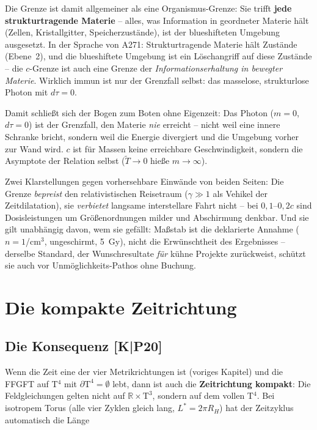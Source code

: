 Die Grenze ist damit allgemeiner als eine Organismus-Grenze: Sie
trifft \textbf{jede strukturtragende Materie} -- alles, was
Information in geordneter Materie hält (Zellen, Kristallgitter,
Speicherzustände), ist der blueshifteten Umgebung ausgesetzt. In
der Sprache von A271: Strukturtragende Materie hält Zustände
(Ebene~2), und die blueshiftete Umgebung ist ein Löschangriff auf
diese Zustände -- die $c$-Grenze ist auch eine Grenze der
\emph{Informationserhaltung in bewegter Materie}. Wirklich immun
ist nur der Grenzfall selbst: das masselose, strukturlose Photon
mit $d\tau = 0$.

Damit schließt sich der Bogen zum Boten ohne Eigenzeit: Das Photon
($m = 0$, $d\tau = 0$) ist der Grenzfall, den Materie \emph{nie}
erreicht -- nicht weil eine innere Schranke bricht, sondern weil
die Energie divergiert und die Umgebung vorher zur Wand wird. $c$
ist für Massen keine erreichbare Geschwindigkeit, sondern die
Asymptote der Relation selbst ($\tilde T \to 0$ hieße
$m \to \infty$).

Zwei Klarstellungen gegen vorhersehbare Einwände von beiden Seiten:
Die Grenze \emph{bepreist} den relativistischen Reisetraum
($\gamma \gg 1$ als Vehikel der Zeitdilatation), sie
\emph{verbietet} langsame interstellare Fahrt nicht -- bei
$0{,}1$--$0{,}2c$ sind Dosisleistungen um Größenordnungen milder
und Abschirmung denkbar. Und sie gilt unabhängig davon, wem sie
gefällt: Maßstab ist die deklarierte Annahme
($n = 1$/cm$^3$, ungeschirmt, 5~Gy), nicht die Erwünschtheit des
Ergebnisses -- derselbe Standard, der Wunschresultate \emph{für}
kühne Projekte zurückweist, schützt sie auch vor
Unmöglichkeits-Pathos ohne Buchung.

\chapter{Die kompakte Zeitrichtung}

\section{Die Konsequenz [K|P20]}

Wenn die Zeit eine der vier Metrikrichtungen ist (voriges Kapitel)
und die FFGFT auf T$^4$ mit $\partial\text{T}^4 = \emptyset$ lebt,
dann ist auch die \textbf{Zeitrichtung kompakt}: Die Feldgleichungen
gelten nicht auf $\mathbb{R}\times\text{T}^3$, sondern auf dem
vollen T$^4$. Bei isotropem Torus (alle vier Zyklen gleich lang,
$L^{*} = 2\pi R_H$) hat der Zeitzyklus automatisch die Länge

